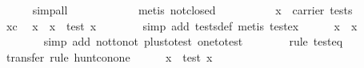 \begin{isabellebody}
\ \ \ \ \isamarkupfalse%
\ simp{}all\isanewline
\ \ \ \ \isamarkupfalse%
\ {}\isanewline
\ \ \ \ \isamarkupfalse%
\ {}metis\ not{}closed{}\isanewline
\ \ \isamarkupfalse%
\ {}\isanewline
\ \ \ \ \isamarkupfalse%
\ {}{}x\ {}\ carrier\ tests{}\isanewline
\ \ \ \ \isamarkupfalse%
\ xc\ \isamarkupfalse%
\ x{}\ \ {}x\ {}\ test\ x{}{}\isanewline
\ \ \ \ \ \ \isamarkupfalse%
\ {}simp\ add{}\ tests{}def{}\ metis\ test{}ex{}\isanewline
\ \ \ \ \isamarkupfalse%
\ {}x\ {}\ {}x\ {}\ {}{}\isanewline
\ \ \ \ \ \ \isamarkupfalse%
\ {}simp\ add{}\ not{}to{}not\ plus{}to{}test\ one{}to{}test{}\isanewline
\ \ \ \ \ \ \isamarkupfalse%
\ {}rule\ test{}eq{}\isanewline
\ \ \ \ \ \ \isamarkupfalse%
\ {}transfer{}\ rule\ hunt{}con{}one{}\isanewline
\ \ \ \ \isamarkupfalse%
\ {}x\ {}\ test\ x{}{}\ \isamarkupfalse%

\end{isabellebody}
